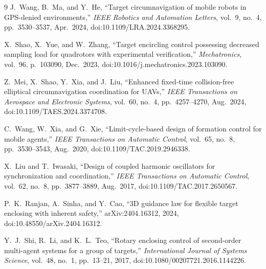 \documentclass[11pt,a4paper]{ctexart}
\theoremstyle{plain}
\theoremstyle{definition}
\theoremstyle{remark}
\begin{document}
\begin{thebibliography}{9}
J.~Wang, B.~Ma, and Y.~He,
``Target circumnavigation of mobile robots in GPS-denied environments,''
\emph{IEEE Robotics and Automation Letters}, vol.~9, no.~4, pp.~3530--3537, Apr.~2024,
doi:10.1109/LRA.2024.3368295.

X.~Shao, X.~Yue, and W.~Zhang,
``Target encircling control possessing decreased sampling load for quadrotors with experimental
verification,''
\emph{Mechatronics}, vol.~96, p.~103090, Dec.~2023, doi:10.1016/j.mechatronics.2023.103090.

Z.~Mei, X.~Shao, Y.~Xia, and J.~Liu,
``Enhanced fixed-time collision-free elliptical circumnavigation coordination for UAVs,''
\emph{IEEE Transactions on Aerospace and Electronic Systems}, vol.~60, no.~4, pp.~4257--4270,
Aug.~2024, doi:10.1109/TAES.2024.3374708.

C.~Wang, W.~Xia, and G.~Xie,
``Limit-cycle-based design of formation control for mobile agents,''
\emph{IEEE Transactions on Automatic Control}, vol.~65, no.~8, pp.~3530--3543, Aug.~2020,
doi:10.1109/TAC.2019.2946338.

X.~Liu and T.~Iwasaki,
``Design of coupled harmonic oscillators for synchronization and coordination,''
\emph{IEEE Transactions on Automatic Control}, vol.~62, no.~8, pp.~3877--3889, Aug.~2017,
doi:10.1109/TAC.2017.2650567.

P.~K.~Ranjan, A.~Sinha, and Y.~Cao,
``3D guidance law for flexible target enclosing with inherent safety,''
arXiv:2404.16312, 2024, doi:10.48550/arXiv.2404.16312.

Y.~J.~Shi, R.~Li, and K.~L.~Teo,
``Rotary enclosing control of second-order multi-agent systems for a group of targets,''
\emph{International Journal of Systems Science}, vol.~48, no.~1, pp.~13--21, 2017,
doi:10.1080/00207721.2016.1144226.
\end{thebibliography}
\end{document}
